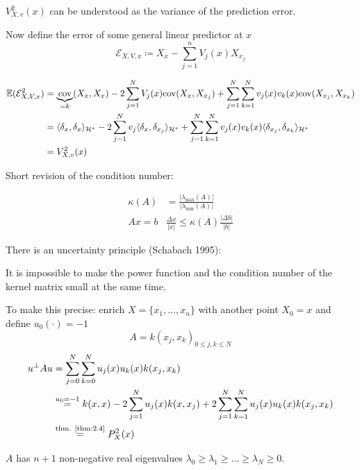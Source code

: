 $V_{X,v}^2(x)$ can be understood as the variance of the prediction error.

Now define the error of some general linear predictor at $x$
\[\mathcal{E}_{X,V,x}\coloneqq X_x-\sum_{j=1}^n V_j(x)X_{x_j}\] %


\begin{align*}
    \mathbb{E}(\mathcal{E}_{X,V,x}^2)&=\underbrace{\text{cov}}_{=k}(X_x,X_x)-2\sum_{j=1}^N V_j(x)\text{cov}(X_x,X_{x_j})+\sum_{j=1}^N\sum_{k=1}^N v_j(x)v_k(x)\text{cov}(X_{x_j},X_{x_k})\\
    &=\langle \delta_x, \delta_x\rangle_{\mathcal{H}^*}-2\sum_{j=1}^{N}v_j\langle \delta_x,\delta_{x_j}\rangle_{\mathcal{H}^*}+\sum_{j=1}^{N}\sum_{k=1}^N v_j(x)v_k(x)\langle \delta_{x_j},\delta_{x_k}\rangle_{\mathcal{H}^*}\\
    &=V_{X,v}^2(x)
\end{align*}

Short revision of the condition number:

\begin{align*}
    \kappa(A)&=\frac{|\lambda_{\max} (A)|}{|\lambda_{\min} (A)|}\\
    Ax=b & \frac{\Delta x}{|x|}\leq \kappa(A)\frac{|\Delta b|}{|b|}
\end{align*}


There is an uncertainty principle (Schabach 1995):

It is impossible to make the power function and the condition number 
of the kernel matrix small at the same time. 

To make this precise: enrich $X=\{x_1,\dots,x_n\}$ with another point $X_0=x$
and define $u_0(\cdot)=-1$
\[A=k(x_j,x_k)_{0\leq j,k\leq N}\]
\begin{align*}
    u^\perp A u&=\sum_{j=0}^N\sum_{k=0}^N u_j(x)u_k(x)k(x_j,x_k)\\
    &\stackrel{u_0=-1}{=}k(x,x)-2\sum_{j=1}^Nu_j(x)k(x,x_j)+2\sum_{j=1}^N\sum_{k=1}^Nu_j(x)u_k(x)k(x_j,x_k)\\
    &\stackrel{\text{thm. \ref{thm:2.4}}}{=}P_X^2(x)
\end{align*}

$A$ has $n+1$ non-negative real eigenvalues $\lambda_0\geq \lambda_1\geq \dots\geq \lambda_N\geq 0$.

